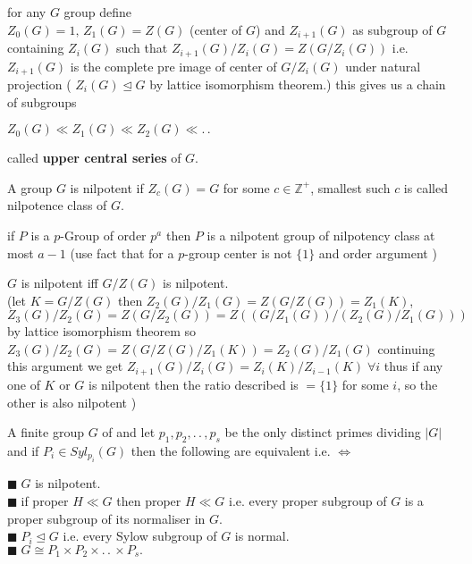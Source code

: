 \documentclass[11pt]{extarticle}
\newcommand{\Z}{\mathbb{Z}}
\newcommand{\ck}{.\,.\,}
\newcommand{\snote}[1]{{\footnotesize(#1)}}
\newcommand{\y}{$\blacksquare\;$}
\newcommand{\tbx}[2][]{
	\begin{tcolorbox}[enhanced,breakable,size=small,colback=black!2!white,title={#1},arc is angular, arc=1.5mm,drop fuzzy shadow]
		#2
	\end{tcolorbox}
}
\begin{document}
\begin{multicols}{2}
	\tbx{for any $ G $ group define \\
		$ Z_0(G)=1,\, Z_1(G)=Z(G) $ (center of $ G $) and $ Z_{i+1}(G) $ as subgroup of $ G $ containing $ Z_i(G) $ such that $ Z_{i+1}(G)/Z_{i}(G)=Z(G/Z_i(G)) $ i.e. $ Z_{i+1}(G) $ is the complete pre image of center of $ G/Z_i(G) $ under natural projection \snote{ $ Z_i(G) \trianglelefteq G $ by lattice isomorphism theorem.} this gives us a chain of subgroups  
		\begin{center}
			$ Z_0(G) \ll Z_1(G)\ll Z_2(G)\ll \ck $
		\end{center}  called \textbf{upper central series} of $ G. $
	}
	\tbx{A group $ G $ is nilpotent if $ Z_c(G)=G $ for some $ c\in \Z^+ $, smallest such $ c $ is called nilpotence class of $ G. $
	}
	\tbx{if $ P $ is a $p$-Group of order $ p^a $ then $ P $ is a nilpotent group of nilpotency class at most $ a-1 $
\snote{use fact that for a $ p $-group center is not $ \{1\} $ and order argument }	}
	\tbx{ $ G $ is nilpotent iff $ G/Z(G) $ is nilpotent.\\
		\snote{let $K=G/Z(G) $ then $ Z_2(G)/Z_1(G)=Z(G/Z(G)) =Z_1(K)$, $ Z_3(G)/Z_2(G)=Z(G/Z_2(G))= Z((G/Z_1(G))/(Z_2(G)/Z_1(G)))$ by lattice isomorphism theorem so $Z_3(G)/Z_2(G)=Z(G/Z(G)/Z_1(K))=Z_2(G)/Z_1(G)$ continuing this argument we get $ Z_{i+1}(G)/Z_i(G)=Z_i(K)/Z_{i-1}(K) \; \forall i$ thus if any one of $ K $ or $ G $ is nilpotent then the ratio described is $= \{1\} $ for some $ i $, so the other is also nilpotent }
	}
	\tbx{A finite group $ G$ of  and let $ p_1,p_2,\ck ,p_s $ be the only distinct primes dividing $ |G| $ and if $ P_i\in Syl_{p_i}(G) $ then the following are equivalent i.e. $ \iff $
		
			\y  $ G $ is nilpotent. \\
			\y  if  proper $ H\ll G $ then proper $H \ll G  $ i.e. every proper subgroup of $ G $ is a proper subgroup of its normaliser in $ G. $ \\
			\y  $ P_i \trianglelefteq G$ i.e. every Sylow subgroup of $ G $ is normal. \\
			\y  $ G \cong P_1\times P_2 \times \ck \times P_s. $ 
		
}
\end{multicols}
\end{document}
